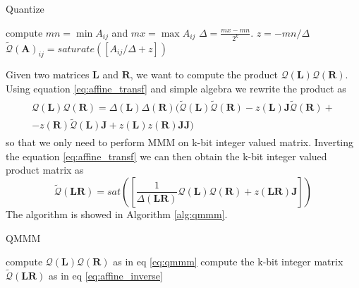 \begin{algorithm}
	\caption{Quantize}\label{alg:quantize}
	\begin{algorithmic}[1]
		\State compute $mn = \min A_{ij}$ and $mx = \max A_{ij}$
		\State $\Delta = \frac{mx - mn}{2^k}$.
		\State $z = -mn/\Delta$
			\State $\tilde{\mathcal{Q}}(\mathbf{A})_{ij} = saturate([A_{ij}/\Delta + z ])$ 
		\EndFor
	\end{algorithmic}
\end{algorithm}

 Given two matrices $\mathbf{L}$ and $\mathbf{R}$, we want to compute the product $\mathcal{Q}(\mathbf{L}) \mathcal{Q}(\mathbf{R})$. Using equation \ref{eq:affine_transf} and simple algebra we rewrite the product as 
\begin{align}\label{eq:qmmm}
\begin{split}
\mathcal{Q}(\mathbf{L}) \mathcal{Q}(\mathbf{R}) = \Delta(\mathbf{L}) \Delta(\mathbf{R}) ( \tilde{\mathcal{Q}}(\mathbf{L}) \tilde{\mathcal{Q}}(\mathbf{R}) - z(\mathbf{L}) \mathbf{J} \tilde{\mathcal{Q}}(\mathbf{R}) + \\
- z(\mathbf{R}) \tilde{\mathcal{Q}}(\mathbf{L}) \mathbf{J} +  z(\mathbf{L}) z(\mathbf{R}) \mathbf{J} \mathbf{J} )
\end{split}
\end{align}
so that we only need to perform MMM on k-bit integer valued matrix. Inverting the equation \ref{eq:affine_transf}  we can then obtain the k-bit integer valued product matrix as 
\begin{equation}\label{eq:affine_inverse}
\tilde{\mathcal{Q}}(\mathbf{LR}) = sat([\frac{1}{\Delta(\mathbf{LR})}\mathcal{Q}(\mathbf{L}) \mathcal{Q}(\mathbf{R}) + z(\mathbf{LR}) \mathbf{J}])
\end{equation} The algorithm is showed in Algorithm \ref{alg:qmmm}.

\begin{algorithm}
	\caption{QMMM}\label{alg:qmmm}
	\begin{algorithmic}[1]
		\State compute $\mathcal{Q}(\mathbf{L}) \mathcal{Q}(\mathbf{R})$ as in eq \ref{eq:qmmm}
		\State compute the k-bit integer matrix $\tilde{\mathcal{Q}}(\mathbf{LR})$ as in eq \ref{eq:affine_inverse}
 	\end{algorithmic}
\end{algorithm}


